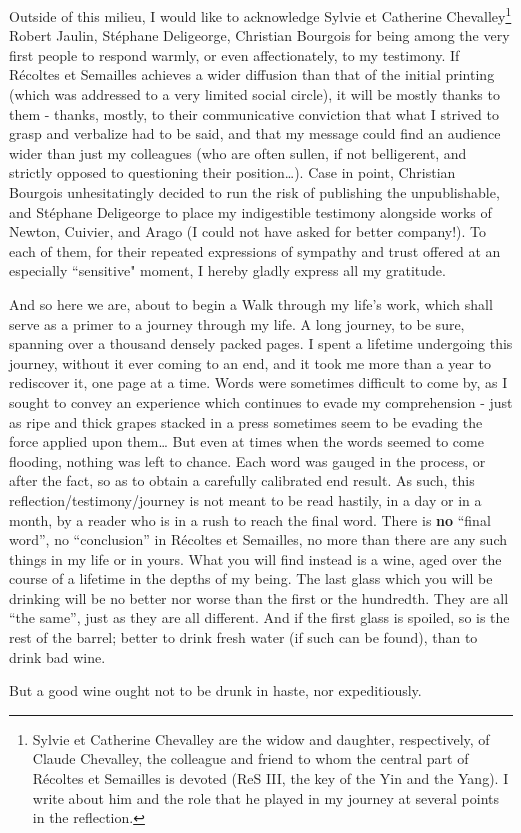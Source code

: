 Outside of this milieu, I would like to acknowledge 
Sylvie et Catherine Chevalley\footnote{Sylvie et Catherine Chevalley are the widow and
daughter, respectively, of Claude Chevalley, the colleague and friend to whom the central part of 
R\'ecoltes et Semailles is devoted (ReS III, the key of the Yin and the Yang).
I write about him and the role that he played in my
journey at several points in the reflection.} Robert Jaulin, St\'ephane Deligeorge, Christian Bourgois for being among the very first people to respond warmly, or even affectionately, to my testimony. 
If R\'ecoltes et Semailles achieves a wider diffusion than that of the initial 
printing (which was addressed to a very limited social circle), it will be mostly thanks to
them - thanks, mostly, to their communicative 
conviction that what I strived to grasp and verbalize had to be said, and that my message could find an audience wider than just my colleagues (who are often sullen,
if not belligerent, and strictly opposed to questioning their position\ldots).
Case in point, Christian Bourgois unhesitatingly decided to run the risk of publishing the unpublishable, and St\'ephane Deligeorge to place my 
indigestible testimony alongside works of Newton, Cuivier, and Arago (I could not have asked for
better company!).
To each of them, for their repeated expressions of sympathy and trust offered at an
especially ``sensitive" moment, I hereby gladly express all my gratitude. 

And so here we are, about to begin a Walk through my life's work, which shall serve as a primer to
a journey through my life. 
A long journey, to be sure, spanning over a thousand densely packed pages. I spent a lifetime undergoing this journey, without it ever 
coming to an end, and it took me more than a year to rediscover it, 
one page at a time.
Words were sometimes difficult to come by, as I sought to convey an experience which continues to evade my comprehension - just as ripe and thick grapes stacked in a press sometimes seem to be evading the force applied upon them\ldots
But even at times when the words seemed to come flooding, nothing was left to chance. 
Each word was gauged in the process, or after the fact, so as to obtain a carefully calibrated end result. As such, this reflection/testimony/journey is not meant to be read hastily, in a day or in a
month, by a reader who is in a rush to reach the final word. There is \textbf{no} 
``final word'', no
``conclusion'' in 
R\'ecoltes et Semailles, no more than there are any such things in my life or in yours. 
What you will find instead is a wine, aged over the course of a lifetime in the depths of my being.
The last glass which you will be drinking will be no better nor worse than the first or the
hundredth. 
They are all ``the same'', just as they are all different. And if the first glass is spoiled,
so is the rest of the barrel; better to drink fresh water (if such can be found),
than to drink bad wine. 

But a good wine ought not to be drunk in haste, nor 
expeditiously. 

%
